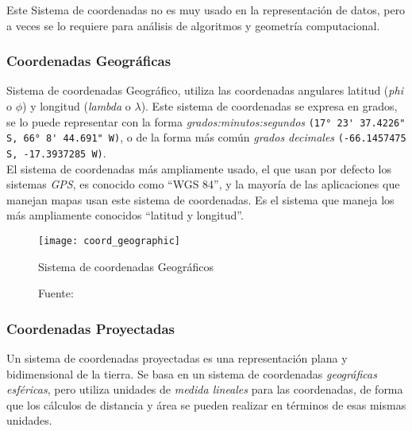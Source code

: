         Este Sistema de coordenadas no es muy usado en la representación de datos, pero a veces se lo requiere para análisis de algoritmos y geometría computacional.

      \subsubsection{Coordenadas Geográficas} %
      \label{subs:coordenadas_geograficas}
        Sistema de coordenadas Geográfico, utiliza las coordenadas angulares latitud  (\emph{phi} o ${\phi}$) y longitud (\emph{lambda} o ${\lambda}$). Este sistema de coordenadas se expresa en grados, se lo puede representar con la forma \emph{grados:minutos:segundos }\verb|(17° 23' 37.4226" S, 66° 8' 44.691" W)|, o de la forma más común \emph{grados decimales} \verb|(-66.1457475 S, -17.3937285 W)|.\\

        El sistema de coordenadas  más ampliamente usado, el que usan por defecto los sistemas \emph{GPS}, es conocido como ``WGS 84'', y la mayoría de las aplicaciones que manejan mapas usan este sistema de coordenadas. Es el sistema que maneja los más ampliamente conocidos ``latitud y longitud''.\\

        \begin{figure}[H]
          \begin{center}
            \texttt{[image: coord\_geographic]}
            \caption{Sistema de coordenadas Geográficos}
            \label{fig:coord geographic}
            \caption*{Fuente: \cite{coords2009} }
          \end{center}

        \end{figure}


      \subsubsection{Coordenadas Proyectadas} %
      \label{subs:coordenadas_proyectadas}
        Un sistema de coordenadas proyectadas es una representación plana y bidimensional de la  tierra. Se basa en un sistema de coordenadas \emph{geográficas esféricas}, pero utiliza unidades de \emph{medida lineales} para las coordenadas, de forma que los cálculos de distancia y área se pueden realizar en términos de esas mismas unidades.\cite{projected} \\

